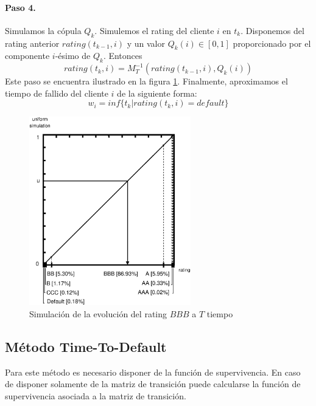 \paragraph{Paso 4.} Simulamos la c\'opula $Q_k$. Simulemos el rating del cliente
$i$ en $t_k$. Disponemos del rating anterior $rating(t_{k-1},i)$ y un valor
$Q_k(i) \in [0,1]$ proporcionado por el componente $i$-\'esimo de $Q_k$. Entonces
\begin{displaymath}
rating(t_k,i) = M_T^{-1}(rating(t_{k-1},i),Q_k(i))
\end{displaymath}
Este paso se encuentra ilustrado en la figura \ref{simrp}. Finalmente, aproximamos
el tiempo de fallido del cliente $i$ de la siguiente forma:
\begin{displaymath}
w_i = inf\{t_k | rating(t_k,i) = default\}
\end{displaymath}

\begin{figure}[!hb]
\begin{center}
\includegraphics[width=7cm,angle=0]{./images/simrp.eps}
\caption{Simulaci\'on de la evoluci\'on del rating $BBB$ a $T$ tiempo}
\label{simrp}
\end{center}
\end{figure}

\subsection{M\'etodo Time-To-Default}
\label{res:mttd}

Para este m\'etodo es necesario disponer de la funci\'on de supervivencia. En caso
de disponer solamente de la matriz de transici\'on puede calcularse la funci\'on
de supervivencia asociada a la matriz de transici\'on.


